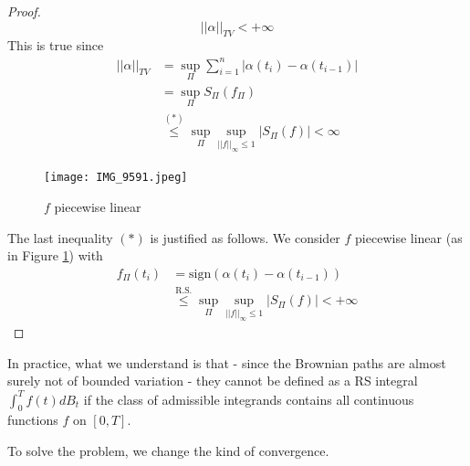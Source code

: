 \begin{proof}
    \begin{equation*}
        ||\alpha||_{TV} < +\infty
    \end{equation*}
    This is true since
    \begin{equation*}
    \begin{split}
        ||\alpha||_{TV} &= \sup_\Pi \sum_{i=1}^n |\alpha(t_i)- \alpha(t_{i-1})|\\
        &= \sup_\Pi S_\Pi(f_\Pi)\\
        & \stackrel{(*)}\leq \sup_\Pi \sup_{||f||_\infty \leq 1} |S_\Pi(f)| < \infty
    \end{split}
    \end{equation*}
     \begin{figure}
\begin{center} 
  \texttt{[image: IMG\_9591.jpeg]}\\ 
  \caption{$f$ piecewise linear}
  \label{fig_2}
\end{center} 
\end{figure} 
    The last inequality $(*)$ is justified as follows. We consider $f$ piecewise linear (as in Figure \ref{fig_2}) with
    \begin{align*}
        f_\Pi(t_i) &= \text{sign}(\alpha(t_i) - \alpha(t_{i-1}))\\
        & \stackrel{ \text{R.S.}}\leq \sup_{\Pi} \sup_{||f||_{\infty} \leq 1} |S_\Pi(f)| < +\infty
    \end{align*} 
\end{proof}
\begin{remark}
    In practice, what we understand is that - since the Brownian paths are almost surely not of bounded variation - they cannot be defined as a RS integral $\int_0^T f(t) dB_t$ if the class of admissible integrands contains all continuous functions $f$ on $[0,T]$.
\end{remark}
To solve the problem, we change the kind of convergence.  
